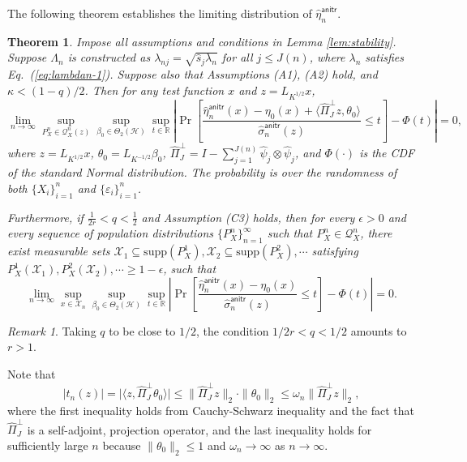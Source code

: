 \documentclass[11pt,a4paper]{article}
\renewcommand{\hat}{\widehat}
\theoremstyle{definition}
\theoremstyle{plain}
\newtheorem{theorem}{Theorem}[section]
\theoremstyle{remark}
\newtheorem{remark}{Remark}[section]
\newcommand{\supp}{\mathrm{supp}}
\newcommand{\mX}{\mathcal X}
\newcommand{\mH}{\mathcal H}
\newcommand{\anitr}{\mathsf{anitr}}
\begin{document}
The following theorem establishes the limiting distribution of $\hat\eta_n^\anitr$.
\begin{theorem}
Impose all assumptions and conditions in Lemma \ref{lem:stability}. Suppose $\Lambda_n$ is constructed as $\lambda_{nj}=\sqrt{\hat s_j\lambda_n}$ for all $j\leq J(n)$,
where $\lambda_n$ satisfies Eq.~(\ref{eq:lambdan-1}). Suppose also that Assumptions (A1), (A2) hold, and $\kappa<(1-q)/2$. Then for any test function $x$ and $z=L_{K^{1/2}}x$, 
$$
\lim_{n\to\infty} \sup_{P_X^n\in\mathcal Q_X^n(z)}\sup_{\beta_0\in\Theta_2(\mH)}\sup_{t\in\mathbb R}\left|\Pr\left[\frac{\hat\eta_n^{\anitr}(x)-\eta_0(x)+\langle\hat\Pi_J^\perp z, \theta_0\rangle}{\hat\sigma_n^\anitr(z)}\leq t\right] - \Phi(t)\right| = 0,
$$
where $z=L_{K^{1/2}}x$, $\theta_0=L_{K^{-1/2}}\beta_0$, $\hat\Pi_J^\perp = I - \sum_{j=1}^{J(n)}\hat\psi_j\otimes\hat\psi_j$, and $\Phi(\cdot)$ is the CDF of the standard Normal distribution.
The probability is over the randomness of both $\{X_i\}_{i=1}^n$ and $\{\varepsilon_i\}_{i=1}^n$. 

{\color{orange}
Furthermore, if $\frac{1}{2r}<q<\frac{1}{2}$ and Assumption (C3) holds, then for every $\epsilon>0$
and every sequence of population distributions $\{P_X^n\}_{n=1}^{\infty}$ such that
$P_X^n\in\mathcal Q_X^n$, there exist measurable sets $\mX_1\subseteq\supp(P_X^1),\mX_2\subseteq\supp(P_X^2),\cdots$ satisfying $P_X^1(\mX_1),P_X^2(\mX_2),\cdots\geq 1-\epsilon$,
such that
$$
\lim_{n\to\infty} \sup_{x\in\mX_n}\sup_{\beta_0\in\Theta_2(\mH)}\sup_{t\in\mathbb R}\left|\Pr\left[\frac{\hat\eta_n^{\anitr}(x)-\eta_0(x)}{\hat\sigma_n^\anitr(z)}\leq t\right] - \Phi(t)\right| = 0.
$$}
\label{thm:anitr-limiting}
\end{theorem}


\begin{remark}
Taking $q$ to be close to $1/2$, the condition $1/2r<q<1/2$ amounts to $r>1$.
\end{remark}

Note that 
\begin{equation}
\big|t_n(z)\big| = \big|\langle z, \hat\Pi_J^\perp\theta_0\rangle\big|\leq \|\hat\Pi_J^\perp z\|_2\cdot \|\theta_0\|_2 \leq \omega_n\|\hat\Pi_J^\perp z\|_2,
\label{eq:anitr-limiting-impl}
\end{equation}
where the first inequality holds from Cauchy-Schwarz inequality and the fact that $\hat\Pi_J^\perp$ is a self-adjoint, projection operator, and the 
last inequality holds for sufficiently large $n$ because $\|\theta_0\|_2\leq 1$ and $\omega_n\to\infty$ as $n\to\infty$.
\end{document}
